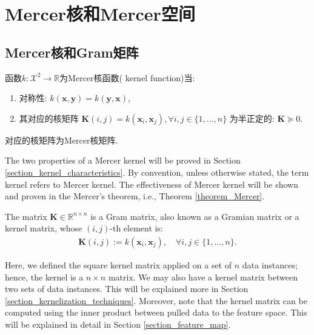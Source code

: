 \documentclass[lang=cn,10pt]{gorgeousnbook}
\numberwithin{equation}{section}%
\numberwithin{figure}{section}%
\begin{document}
\section{Mercer核和Mercer空间}\label{section_Mercer_kernel_and_spaces}

\subsection{Mercer核和Gram矩阵}

\begin{definition}\label{definition_Mercer_kernel}
函数$k: \mathcal{X}^2 \rightarrow \mathbb{R}$为Mercer核函数( kernel function)当:

\begin{enumerate}[topsep=0pt,itemsep=-1ex,partopsep=1ex,parsep=1ex]
\item 对称性: $k(\boldsymbol{x}, \boldsymbol{y}) = k(\boldsymbol{y}, \boldsymbol{x})$,
\item 其对应的核矩阵 $\boldsymbol{K}(i,j) = k(\boldsymbol{x}_i, \boldsymbol{x}_j), \forall i,j \in \{1, \dots, n\}$ 为半正定的: $\boldsymbol{K} \succeq 0$. 
\end{enumerate}

对应的核矩阵为Mercer核矩阵. 
\end{definition}

The two properties of a Mercer kernel will be proved in Section \ref{section_kernel_characteristics}.
By convention, unless otherwise stated, the term kernel refers to Mercer kernel. 
The effectiveness of Mercer kernel will be shown and proven in the Mercer's theorem, i.e., Theorem \ref{theorem_Mercer}.

\begin{definition}\label{definition_Gram_matrix}
The matrix $\boldsymbol{K} \in \mathbb{R}^{n \times n}$ is a Gram matrix, also known as a Gramian matrix or a kernel matrix, whose $(i,j)$-th element is:
\begin{align}\label{equation_Gram_matrix}
\boldsymbol{K}(i,j) := k(\boldsymbol{x}_i, \boldsymbol{x}_j), \quad \forall i,j \in \{1, \dots, n\}.
\end{align}
\end{definition}
Here, we defined the square kernel matrix applied on a set of $n$ data instances; hence, the kernel is a $n \times n$ matrix. We may also have a kernel matrix between two sets of data instances. This will be explained more in Section \ref{section_kernelization_techniques}. 
Moreover, note that the kernel matrix can be computed using the inner product between pulled data to the feature space. This will be explained in detail in Section \ref{section_feature_map}.
\end{document}

